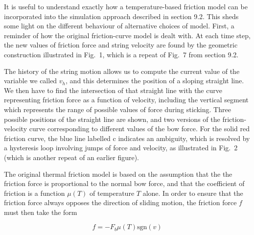   It is useful to understand exactly how a temperature-based friction model can 
  be incorporated into the simulation approach described in section 9.2. This 
  sheds some light on the different behaviour of alternative choices of model. 
  First, a reminder of how the original friction-curve model is dealt with. At 
  each time step, the new values of friction force and string velocity are 
  found by the geometric construction illustrated in Fig.\ 1, which is a repeat 
  of Fig.\ 7 from section 9.2. 


  The history of the string motion allows us to compute the current value of 
  the variable we called $v_h$, and this determines the position of a sloping 
  straight line. We then have to find the intersection of that straight line 
  with the curve representing friction force as a function of velocity, 
  including the vertical segment which represents the range of possible values 
  of force during sticking. Three possible positions of the straight line are 
  shown, and two versions of the friction-velocity curve corresponding to 
  different values of the bow force. For the solid red friction curve, the blue 
  line labelled c indicates an ambiguity, which is resolved by a hysteresis 
  loop involving jumps of force and velocity, as illustrated in Fig.\ 2 (which 
  is another repeat of an earlier figure). 


  The original thermal friction model is based on the assumption that the the 
  friction force is proportional to the normal bow force, and that the 
  coefficient of friction is a function $\mu(T)$ of temperature $T$ alone. In 
  order to ensure that the friction force always opposes the direction of 
  sliding motion, the friction force $f$ must then take the form 

  $$f=-F_b \mu(T) \mathrm{sgn}(v) \tag{1}$$ 

